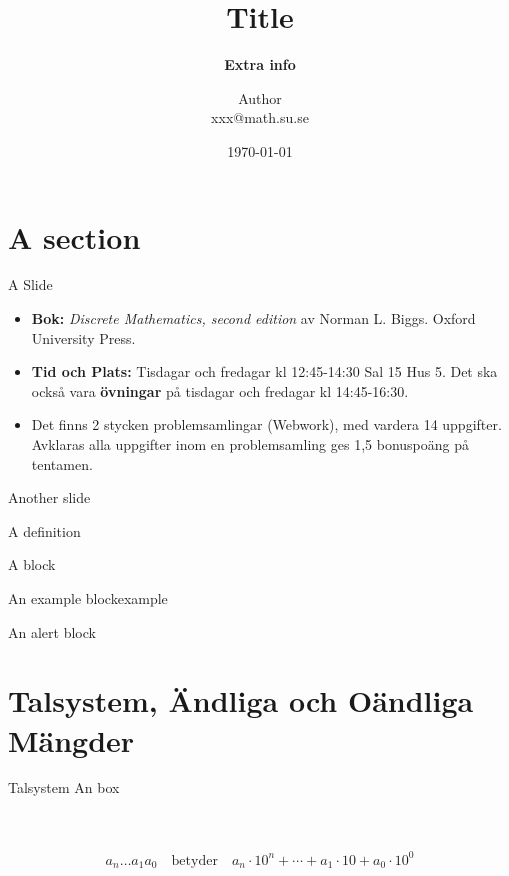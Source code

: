 \documentclass[10pt, t, fleqn, aspectratio=43, %
]{beamer} %
\title[Short title] %
{ %
      \textbf{Title}
}
\subtitle[]
{
      \textbf{Extra info}
}
\author[Short Author]
{      Author \\
      \alert{\ttfamily xxx@math.su.se}
}
\institute[]
{
10

      Department of Mathematics, Faculty of Science\\
      Stockholm University\\
  
}
\date{\today}
\begin{document}

\section{A section}

\begin{frame}{A Slide}

  \begin{itemize}
    \item<1-> \textbf{Bok:} \emph{Discrete Mathematics, second edition} av Norman L. Biggs. Oxford University Press.
    \item<2-> \textbf{Tid och Plats:} Tisdagar och fredagar kl 12:45-14:30 Sal 15 Hus 5. Det ska ocks\aa\; vara \textbf{\"ovningar} p\aa\; tisdagar och fredagar kl 14:45-16:30.
    \item<3-> Det finns 2 stycken problemsamlingar (Webwork), med vardera 14 uppgifter. Avklaras alla uppgifter inom en problemsamling  ges 1,5 bonuspo\"ang p\aa\; tentamen.
  \end{itemize}
\end{frame}
\begin{frame}{Another slide}
\begin{definition}
A definition
\end{definition}
\begin{block}
{A block}
\end{block}
\begin{exampleblock}
{An example block}example
\end{exampleblock}
\begin{alertblock}
{An alert block}
\end{alertblock}
\end{frame}


\section{Talsystem, \"Andliga och O\"andliga M\"angder}
\begin{frame}{Talsystem}
    An box\\
    \hfill\\
    \begin{tcolorbox}[colback=migrey!50,colframe=miblue]
     \hfill\\
 $$a_n\ldots a_1a_0\quad\text{betyder}\quad a_n\cdot 10^n+\cdots+a_1\cdot 10+a_0\cdot 10^0$$
\end{tcolorbox}

 
\end{frame}
\end{document}
